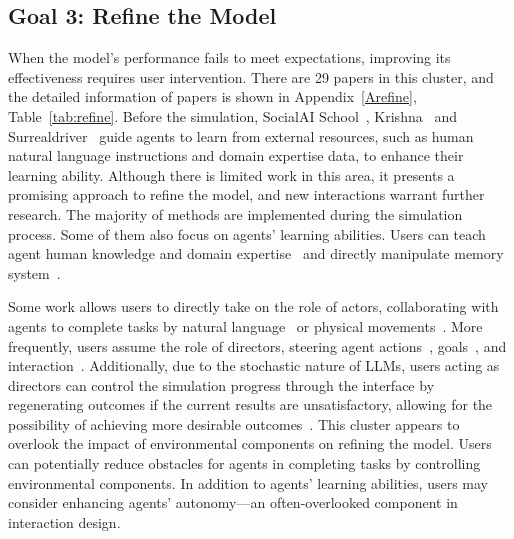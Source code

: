 

\subsection{Goal 3: Refine the Model}
When the model’s performance fails to meet expectations, improving its effectiveness requires user intervention.
There are 29 papers in this cluster, and the detailed information of papers is shown in Appendix~\ref{Arefine}, Table~\ref{tab:refine}.
Before the simulation, SocialAI School~\cite{gao2023s3socialnetworksimulationlarge}, Krishna\etal~\cite{doi:10.1073/pnas.2115730119} and Surrealdriver~\cite{jin2024surrealdriverdesigningllmpoweredgenerative} guide agents to learn from external resources, such as human natural language instructions and domain expertise data, to enhance their learning ability.
Although there is limited work in this area, it presents a promising approach to refine the model, and new interactions warrant further research.
The majority of methods are implemented during the simulation process.
Some of them also focus on agents' learning abilities.
Users can teach agent human knowledge and domain expertise~\cite{unknown, 10.1145/3613904.3642349, cui2024chatlawmultiagentcollaborativelegal} and directly manipulate memory system~\cite{10.1145/3586182.3615796}.

Some work allows users to directly take on the role of actors, collaborating with agents to complete tasks by natural language~\cite{zhang2024buildingcooperativeembodiedagents} or physical movements~\cite{mandi2023rocodialecticmultirobotcollaboration}.
More frequently, users assume the role of directors, steering agent actions~\cite{mehta2024improvinggroundedlanguageunderstanding, mohanty2023transforminghumancenteredaicollaboration, Padmakumar_Thomason_Shrivastava_Lange_Narayan-Chen_Gella_Piramuthu_Tur_Hakkani-Tur_2022}, goals~\cite{huang2022innermonologueembodiedreasoning,chen2023agentversefacilitatingmultiagentcollaboration}, and interaction~\cite{park2023choicematessupportingunfamiliaronline}.
Additionally, due to the stochastic nature of LLMs, users acting as directors can control the simulation progress through the interface by regenerating outcomes if the current results are unsatisfactory, allowing for the possibility of achieving more desirable outcomes~\cite{chen2023agentversefacilitatingmultiagentcollaboration,chan2023chatevalbetterllmbasedevaluators}.
This cluster appears to overlook the impact of environmental components on refining the model.
Users can potentially reduce obstacles for agents in completing tasks by controlling environmental components.
In addition to agents' learning abilities, users may consider enhancing agents' autonomy—an often-overlooked component in interaction design.



